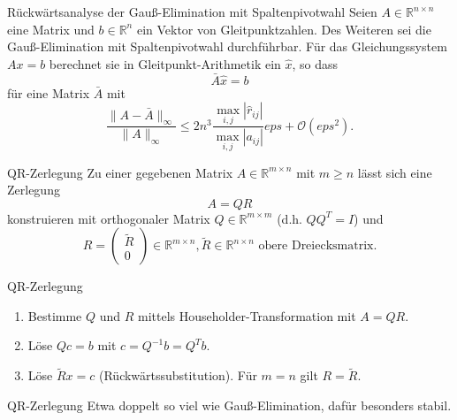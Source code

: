 \begin{flashcard}[Satz]{Rückwärtsanalyse der Gauß-Elimination mit Spaltenpivotwahl}
	Seien $A \in \mathbb{R}^{n \times n}$ eine Matrix und $b \in \mathbb{R}^n$ ein Vektor von Gleitpunktzahlen.
	Des Weiteren sei die Gauß-Elimination mit Spaltenpivotwahl durchführbar.
	Für das Gleichungssystem $Ax = b$ berechnet sie in Gleitpunkt-Arithmetik ein $\hat{x}$, so dass
	$$ \bar{A}\hat{x} = b $$
	für eine Matrix $\bar{A}$ mit
	$$ \frac{\|A - \bar{A}\|_\infty}{\|A\|_\infty} \leq 2 n^3 \frac{\max_{i,j} |\hat{r}_{ij}|}{\max_{i,j} |a_{ij}|} eps + \mathcal{O}(eps^2).$$
\end{flashcard}

\begin{flashcard}[Definition]{QR-Zerlegung}
	Zu einer gegebenen Matrix $A \in \mathbb{R}^{m \times n}$ mit $m \geq n$ lässt sich eine Zerlegung
	$$ A = QR $$
	konstruieren mit orthogonaler Matrix $Q \in \mathbb{R}^{m \times m}$ (d.h. $QQ^T = I$) und
$$ R = \begin{pmatrix}\tilde{R}\\0\end{pmatrix} \in \mathbb{R}^{m \times n}, \tilde{R} \in \mathbb{R}^{n \times n} \text{ obere Dreiecksmatrix.}$$
\end{flashcard}

\begin{flashcard}[Algorithmus]{QR-Zerlegung}
	\begin{enumerate}
		\item Bestimme $Q$ und $R$ mittels Householder-Transformation mit $A = QR$.
		\item Löse $Qc = b$ mit $c = Q^{-1} b = Q^T b$.
		\item Löse $\tilde{R}x = c$ (Rückwärtssubstitution). Für $m = n$ gilt $R = \tilde{R}$.
	\end{enumerate}
\end{flashcard}

\begin{flashcard}[Aufwand]{QR-Zerlegung}
	Etwa doppelt so viel wie Gauß-Elimination, dafür besonders stabil.
\end{flashcard}
